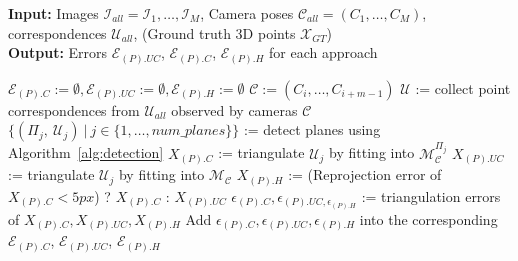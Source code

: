 \documentclass{article}
\begin{document}
\begin{algorithm}[H]
\caption{Plane-constrained triangulation (Experimental pipeline)}
\label{alg:experiment}
\textbf{Input:} Images $\mathcal{I}_{all} = \mathcal{I}_1,\ldots,\mathcal{I}_M$, Camera poses $\mathcal{C}_{all} = (C_1,\ldots,C_M)$, correspondences $\mathcal{U}_{all}$, (Ground truth 3D points $\mathcal{X}_{GT}$) \\
\textbf{Output:} Errors $\mathcal{E}_{(P).UC}$, $\mathcal{E}_{(P).C}$, $\mathcal{E}_{(P).H}$ for each approach
\begin{algorithmic}[1]
\STATE  $\mathcal{E}_{(P).C} := \emptyset, \mathcal{E}_{(P).UC} := \emptyset, \mathcal{E}_{(P).H} := \emptyset$
    \STATE $\mathcal{C} := (C_i,\ldots,C_{i+m-1})$
    \STATE $\mathcal{U}$ := collect point correspondences from $\mathcal{U}_{all}$ observed by cameras $\mathcal{C}$
    \STATE $\{(\Pi_j, \ \mathcal{U}_j) \ \vert \ j \in \{1,\ldots,num\_planes\}\}$ := detect planes using Algorithm~\ref{alg:detection}
    \STATE $X_{(P).C}$ := triangulate $\mathcal{U}_j$ by fitting into $\mathcal{M}_{\mathcal{C}}^{\Pi_j}$
    \STATE $X_{(P).UC}$ := triangulate $\mathcal{U}_j$ by fitting into $\mathcal{M}_{\mathcal{C}}$
    \STATE $X_{(P).H}$ := (Reprojection error of $X_{(P).C} < 5px$) ? $X_{(P).C}$ : $X_{(P).UC}$
    \STATE $\epsilon_{(P).C}, \epsilon_{(P).UC, \epsilon_{(P).H}}$ := triangulation errors of $X_{(P).C}, X_{(P).UC}, X_{(P).H}$
    \STATE Add $\epsilon_{(P).C}, \epsilon_{(P).UC}, \epsilon_{(P).H}$ into the corresponding $\mathcal{E}_{(P).C}$, $\mathcal{E}_{(P).UC}$, $\mathcal{E}_{(P).H}$
    \ENDFOR
\ENDFOR
\end{algorithmic}
\end{algorithm}

\printbibliography
\end{document}

